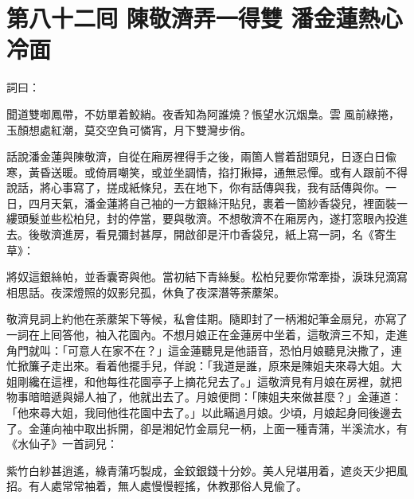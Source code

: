 
\chapter*{第八十二囘 陳敬濟弄一得雙 潘金蓮熱心冷面}


詞曰：

\begin{myquote}
聞道雙啣鳳帶，不妨單着鮫綃。夜香知為阿誰燒？悵望水沉烟梟。雲𩬆風前綠捲，玉顏想處紅潮，莫交空負可憐宵，月下雙灣步俏。

\end{myquote}

話說潘金蓮與陳敬濟，自從在廂房裡得手之後，兩箇人嘗着甜頭兒，日逐白日偸寒，黃昏送暖。或倚肩嘲笑，或並坐調情，掐打揪撏，通無忌憚。或有人跟前不得說話，將心事寫了，搓成紙條兒，丟在地下，你有話傳與我，我有話傳與你。一日，四月天氣，潘金蓮將自己袖的一方銀絲汗貼兒，裹着一箇紗香袋兒，裡面裝一縷頭髮並些松柏兒，封的停當，要與敬濟。不想敬濟不在廂房內，遂打窓眼內投進去。後敬濟進房，看見彌封甚厚，開啟卻是汗巾香袋兒，紙上寫一詞，名《寄生草》：

\begin{myquote}
將奴這銀絲帕，並香囊寄與他。當初結下青絲髮。松柏兒要你常牽掛，淚珠兒滴寫相思話。夜深燈照的奴影兒孤，休負了夜深潛等荼䕷架。
\end{myquote}

敬濟見詞上約他在荼䕷架下等候，私會佳期。隨即封了一柄湘妃筆金扇兒，亦寫了一詞在上囘答他，袖入花園內。不想月娘正在金蓮房中坐着，這敬濟三不知，走進角門就叫：「可意人在家不在？」這金蓮聽見是他語音，恐怕月娘聽見決撒了，連忙掀簾子走出來。看着他擺手兒，佯說：「我道是誰，原來是陳姐夫來尋大姐。大姐剛纔在這裡，和他每徃花園亭子上摘花兒去了。」{}這敬濟見有月娘在房裡，就把物事暗暗遞與婦人袖了，他就出去了。月娘便問：「陳姐夫來做甚麼？」金蓮道：「他來尋大姐，我囘他徃花園中去了。」以此瞞過月娘。少頃，月娘起身囘後邊去了。金蓮向袖中取出拆開，卻是湘妃竹金扇兒一柄，上面一種青蒲，半溪流水，有《水仙子》一首詞兒：

\begin{myquote}
紫竹白紗甚逍遙，綠青蒲巧製成，金鉸銀錢十分妙。美人兒堪用着，遮炎天少把風招。有人處常常袖着，無人處慢慢輕搖，休教那俗人見偸了。{}
\end{myquote}

